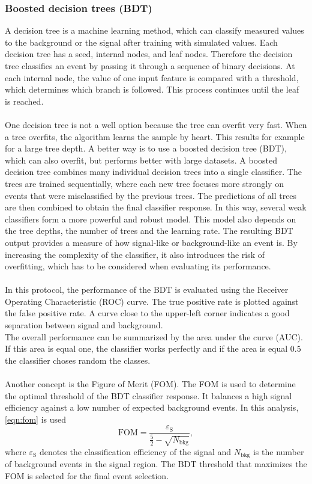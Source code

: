 \subsubsection{Boosted decision trees (BDT)}
\label{sec:bdt}
A decision tree is a machine learning method, which can classify measured values to the background or the signal after training with simulated values. Each decision tree has a seed, internal nodes, and leaf nodes. Therefore the decision tree classifies an event by passing it through a sequence of binary decisions. At each internal node, the value of one input feature is compared with a threshold, which determines which branch is followed. This process continues until the leaf is reached.\\\\
One decision tree is not a well option because the tree can overfit very fast. When a tree overfits, the algorithm learns the sample by heart. This results for example for a large tree depth. A better way is to use a boosted decision tree (BDT), which can also overfit, but performs better with large datasets. A boosted decision tree combines many individual decision trees into a single classifier. The trees are trained sequentially, where each new tree focuses more strongly on events that were misclassified by the previous trees. The predictions of all trees are then combined to obtain the final classifier response. In this way, several weak classifiers form a more powerful and robust model. This model also depends on the tree depths, the number of trees and the learning rate. The resulting BDT output provides a measure of how signal-like or background-like an event is. By increasing the complexity of the classifier, it also introduces the risk of overfitting, which has to be considered when evaluating its performance.\\\\
In this protocol, the performance of the BDT is evaluated using the Receiver Operating Characteristic (ROC) curve. The true positive rate is plotted against the false positive rate. A curve close to the upper-left corner indicates a good separation between signal and background.\\
The overall performance can be summarized by the area under the curve (AUC). If this area is equal one, the classifier works perfectly and if the area is equal $\num{0.5}$ the classifier choses random the classes.\\\\
Another concept is the Figure of Merit (FOM). The FOM is used to determine the optimal threshold of the BDT classifier response. It balances a high signal efficiency against a low number of expected background events. In this analysis, \autoref{eqn:fom} is used
\begin{equation}
    \mathrm{FOM} = \frac{\varepsilon_{\mathrm{S}}}{\frac{5}{2}-\sqrt{N_{\text{bkg}}}},
    \label{eqn:fom}
\end{equation}
where $\varepsilon_{\mathrm{S}}$ denotes the classification efficiency of the signal and $N_{\text{bkg}}$ is the number of background events in the signal region. The BDT threshold that maximizes the FOM is selected for the final event selection.

